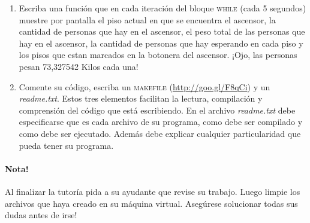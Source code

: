 \documentclass[letterpaper,10pt]{article}
\begin{document}
\begin{enumerate}
 \item Escriba una función que en cada iteración del bloque \textsc{while} (cada 5 segundos) muestre por pantalla el piso actual en que se encuentra
 el ascensor, la cantidad de personas que hay en el ascensor, el peso total de las personas que hay en el ascensor, la cantidad de personas
 que hay esperando en cada piso y los pisos que estan marcados en la botonera del ascensor. ¡Ojo, las personas pesan 73,327542 Kilos cada una!

 \item Comente su código, escriba un \textsc{makefile} (\href{http://goo.gl/F8qCi}{http://goo.gl/F8qCi}) y un \textit{readme.txt}. Estos tres elementos facilitan la lectura, compilación y
 comprensión del código que está escribiendo.
En el archivo \textit{readme.txt} debe especificarse que es cada archivo de su programa, como debe ser compilado y como debe ser ejecutado. Además debe
 explicar cualquier particularidad que pueda tener su programa.
\end{enumerate}

\paragraph{Nota!}
Al finalizar la tutoría pida a su ayudante que revise su trabajo. Luego limpie los archivos que haya creado en su máquina virtual.
Asegúrese solucionar todas sus dudas antes de irse!
\end{document}
